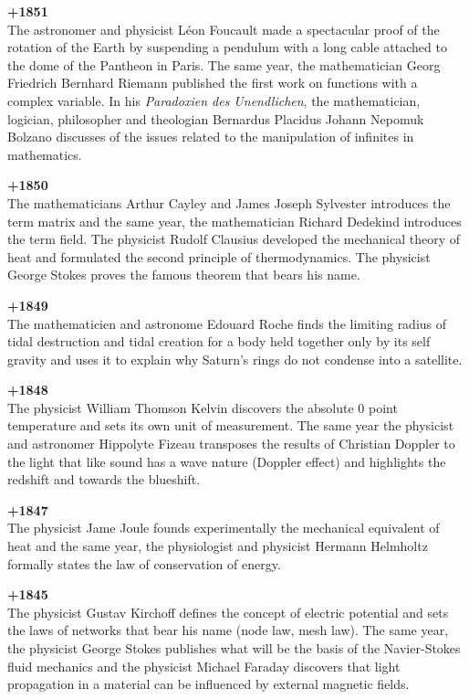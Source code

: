\textbf{+1851}\\
The astronomer and physicist Léon Foucault made a spectacular proof of the rotation of the Earth by suspending a pendulum with a long cable attached to the dome of the Pantheon in Paris. The same year, the mathematician Georg Friedrich Bernhard Riemann published the first work on functions with a complex variable. In his \textit{Paradoxien des Unendlichen}, the  mathematician, logician, philosopher and theologian Bernardus Placidus Johann Nepomuk Bolzano discusses of the issues related to the manipulation of infinites in mathematics. 

\textbf{+1850}\\
The mathematicians Arthur Cayley and James Joseph Sylvester introduces the term matrix and the same year, the mathematician Richard Dedekind introduces the term field. The physicist Rudolf Clausius developed the mechanical theory of heat and formulated the second principle of thermodynamics. The physicist George Stokes proves the famous theorem that bears his name.

\textbf{+1849}\\
The mathematicien and astronome Edouard Roche finds the limiting radius of tidal destruction and tidal creation for a body held together only by its self gravity and uses it to explain why Saturn's rings do not condense into a satellite.

\textbf{+1848}\\
The physicist William Thomson Kelvin discovers the absolute 0 point temperature and sets its own unit of measurement. The same year the physicist and astronomer Hippolyte Fizeau transposes the results of Christian Doppler to the light that like sound has a wave nature (Doppler effect) and highlights the redshift and towards the blueshift.

\textbf{+1847}\\
The physicist Jame Joule founds experimentally the mechanical equivalent of heat and the same year, the physiologist and physicist Hermann Helmholtz formally states the law of conservation of energy.

\textbf{+1845}\\
The physicist Gustav Kirchoff defines the concept of electric potential and sets the laws of networks that bear his name (node law, mesh law). The same year, the physicist George Stokes publishes what will be the basis of the Navier-Stokes fluid mechanics and the physicist Michael Faraday discovers that light propagation in a material can be influenced by external magnetic fields.

